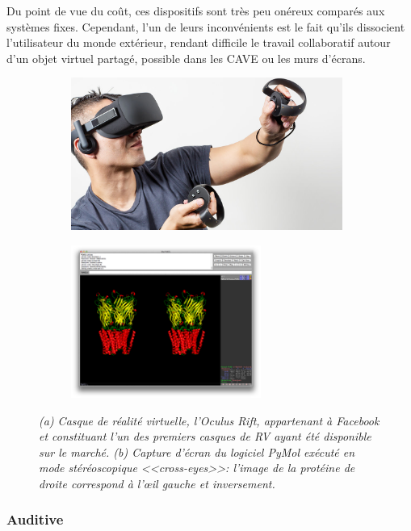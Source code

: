 Du point de vue du coût, ces dispositifs sont très peu onéreux comparés aux systèmes fixes. Cependant, l'un de leurs inconvénients est le fait qu'ils dissocient l'utilisateur du monde extérieur, rendant difficile le travail collaboratif autour d'un objet virtuel partagé, possible dans les CAVE ou les murs d'écrans.

\begin{figure}
\begin{subfigure}{.6\textwidth}
  \centering
  {\includegraphics[height=5cm]{./figures/ch2/occulus}}
    \caption{}
  \label{Fig:occulus}
\end{subfigure}
\begin{subfigure}{.4\textwidth}
  \centering
  {\includegraphics[height=5cm]{./figures/ch2/pymol_stereo}}
    \caption{}
  \label{Fig:pymol_stereo}
\end{subfigure}
\caption[(a) Casque de Réalité Virtuelle. (b) Capture d'écran du logiciel PyNol en mode stéréoscopique.]{\it (a) Casque de réalité virtuelle, l'Oculus Rift, appartenant à Facebook et constituant l'un des premiers casques de RV ayant été disponible sur le marché. (b) Capture d'écran du logiciel PyMol exécuté en mode stéréoscopique <<cross-eyes>>: l'image de la protéine de droite correspond à l'œil gauche et inversement.}
\end{figure}



\subsubsection{Auditive} \label{immersion_audio}

